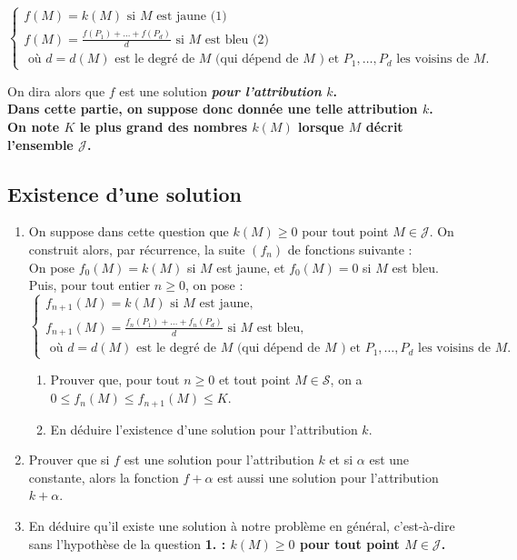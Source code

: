 \documentclass[landscape,twocolumn,leqno,a4paper,10pt]{report} %
\newcommand\n{\noindent}
\renewcommand{\geq}{\geqslant}
\renewcommand{\leq}{\leqslant}
\renewcommand{\textbf}[1]{\begingroup\bfseries\mathversion{bold}#1\endgroup}		%
\begin{document}
$$\left\{\begin{array}{l}
f(M)=k(M) \text { si } M \text { est jaune (1) } \\
f(M)=\frac{f\left(P_{1}\right)+\ldots+f\left(P_{d}\right)}{d} \text { si } M \text { est bleu (2) } \\
\text { où } d=d(M) \text { est le degré de } M \text { (qui dépend de } M \text { ) et } P_{1}, \ldots, P_{d} \text { les voisins de } M \text {. }
\end{array}\right.$$

\n On dira alors que $f$ est une solution \textbf{\textit{pour l'attribution}} $k$.\\
Dans cette partie, on suppose donc donnée une telle attribution $k$.\\
On note $K$ le plus grand des nombres $k(M)$ lorsque $M$ décrit l'ensemble $\mathscr{J}$.

\subsection{Existence d'une solution}

\begin{enumerate}
	\item On suppose dans cette question que $k(M) \geq 0$ pour tout point $M \in \mathscr{J}$. On construit alors, par récurrence, la suite $\left(f_{n}\right)$ de fonctions suivante :\\
	On pose $f_{0}(M)=k(M)$ si $M$ est jaune, et $f_{0}(M)=0$ si $M$ est bleu.\\
	Puis, pour tout entier $n \geq 0$, on pose :
	$$\left\{\begin{array}{l}
f_{n+1}(M)=k(M) \text { si } M \text { est jaune, } \\
f_{n+1}(M)=\frac{f_{n}\left(P_{1}\right)+\ldots+f_{n}\left(P_{d}\right)}{d} \text { si } M \text { est bleu, } \\
\text { où } d=d(M) \text { est le degré de } M \text { (qui dépend de } M \text { ) et } P_{1}, \ldots, P_{d} \text { les voisins de } M \text {. }
\end{array}\right.$$
	\begin{enumerate}
		\item Prouver que, pour tout $n \geq 0$ et tout point $M \in \mathscr{S}$, on a $0 \leq f_{n}(M) \leq f_{n+1}(M) \leq K$.
		\item En déduire l'existence d'une solution pour l'attribution $k$.
	\end{enumerate}
	\item Prouver que si $f$ est une solution pour l'attribution $k$ et si $\alpha$ est une constante, alors la fonction $f+\alpha$ est aussi une solution pour l'attribution $k+\alpha$.
	\item En déduire qu'il existe une solution à notre problème en général, c'est-à-dire sans l'hypothèse de la question \textbf{1.} : $k(M) \geq 0$ pour tout point $M \in \mathscr{J}$.
\end{enumerate}
\end{document}
